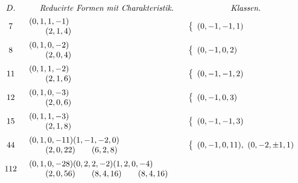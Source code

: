 ﻿\documentclass[11pt,a4paper]{article}
\theoremstyle{plain}
\theoremstyle{definition}
\begin{document}
\[
\begin{array}{c@{\quad}l@{\qquad}l}
D. & \multicolumn{1}{c}{\textit{Reducirte Formen mit Charakteristik.}}
& \multicolumn{1}{c}{\textit{Klassen.}}\\[0.4em]
7&
\begin{array}{l}
(0,1,1,-1)\\
\qquad(2,1,4)
\end{array}
&
\left\{\begin{array}{l}(0,-1,-1,1)\end{array}\right.\\[1.1em]
8&
\begin{array}{l}
(0,1,0,-2)\\
\qquad(2,0,4)
\end{array}
&
\left\{\begin{array}{l}(0,-1,0,2)\end{array}\right.\\[1.1em]
11&
\begin{array}{l}
(0,1,1,-2)\\
\qquad(2,1,6)
\end{array}
&
\left\{\begin{array}{l}(0,-1,-1,2)\end{array}\right.\\[1.1em]
12&
\begin{array}{l}
(0,1,0,-3)\\
\qquad(2,0,6)
\end{array}
&
\left\{\begin{array}{l}(0,-1,0,3)\end{array}\right.\\[1.1em]
15&
\begin{array}{l}
(0,1,1,-3)\\
\qquad(2,1,8)
\end{array}
&
\left\{\begin{array}{l}(0,-1,-1,3)\end{array}\right.\\[1.1em]
44&
\begin{array}{l}
(0,1,0,-11)(1,-1,-2,0)\\
\qquad(2,0,22)\qquad(6,2,8)
\end{array}
&
\left\{\begin{array}{l}
(0,-1,0,11),\ (0,-2,\pm1,1)
\end{array}\right.\\[1.1em]
112&
\begin{array}{l}
(0,1,0,-28)(0,2,2,-2)(1,2,0,-4)\\
\qquad(2,0,56)\qquad(8,4,16)\qquad(8,4,16)\\

\end{array}
\end{array}\]
\end{document}
